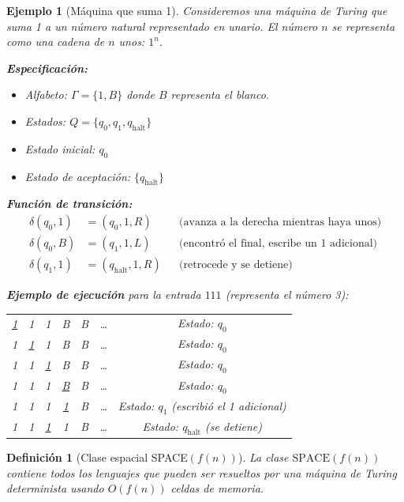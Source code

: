 \documentclass[a4paper,11pt]{report}
\newtheorem{definition}[theorem]{Definición}
\newtheorem{example}[theorem]{Ejemplo}
\begin{document}
\begin{example}[Máquina que suma 1]
Consideremos una máquina de Turing que suma 1 a un número natural representado en unario. El número $n$ se representa como una cadena de $n$ unos: $1^n$.

\textbf{Especificación:}
\begin{itemize}
\item Alfabeto: $\Gamma = \{1, B\}$ donde $B$ representa el blanco.
\item Estados: $Q = \{q_0, q_1, q_{\text{halt}}\}$
\item Estado inicial: $q_0$
\item Estado de aceptación: $\{q_{\text{halt}}\}$
\end{itemize}

\textbf{Función de transición:}
\begin{align*}
\delta(q_0, 1) &= (q_0, 1, R) && \text{(avanza a la derecha mientras haya unos)} \\
\delta(q_0, B) &= (q_1, 1, L) && \text{(encontró el final, escribe un 1 adicional)} \\
\delta(q_1, 1) &= (q_{\text{halt}}, 1, R) && \text{(retrocede y se detiene)}
\end{align*}

\textbf{Ejemplo de ejecución} para la entrada $111$ (representa el número 3):

\begin{center}
\begin{tabular}{ccccccc}
\underline{1} & 1 & 1 & B & B & \ldots & Estado: $q_0$ \\
1 & \underline{1} & 1 & B & B & \ldots & Estado: $q_0$ \\
1 & 1 & \underline{1} & B & B & \ldots & Estado: $q_0$ \\
1 & 1 & 1 & \underline{B} & B & \ldots & Estado: $q_0$ \\
1 & 1 & 1 & \underline{1} & B & \ldots & Estado: $q_1$ (escribió el 1 adicional) \\
1 & 1 & \underline{1} & 1 & B & \ldots & Estado: $q_{\text{halt}}$ (se detiene) \\
\end{tabular}
\end{center}
\end{example}

\begin{definition}[Clase espacial SPACE$(f(n))$]
La clase $\text{SPACE}(f(n))$ contiene todos los lenguajes que pueden ser resueltos por una máquina de Turing determinista usando $O(f(n))$ celdas de memoria.
\end{definition}
\end{document}
